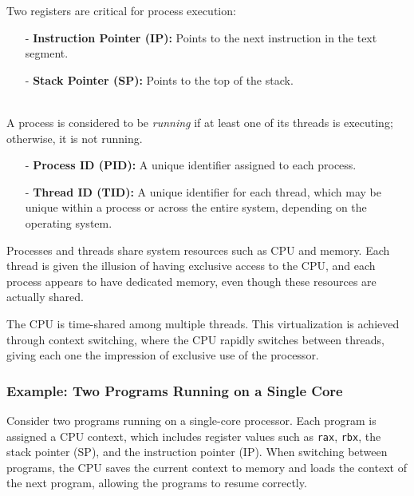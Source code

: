 \documentclass[../../compsys.tex]{subfiles}
\begin{document}
\begin{definition}
Two registers are critical for process execution:
\begin{itemize}
  \item[-] \textbf{Instruction Pointer (IP):} Points to the next instruction in the text segment.
  \item[-] \textbf{Stack Pointer (SP):} Points to the top of the stack.
\end{itemize}
\end{definition}

\begin{definition}
\leavevmode\\ %
A process is considered to be \emph{running} if at least one of its threads is executing; otherwise, it is not running.
\begin{itemize}
  \item[-] \textbf{Process ID (PID):} A unique identifier assigned to each process.
  \item[-] \textbf{Thread ID (TID):} A unique identifier for each thread, which may be unique within a process or across the entire system, depending on the operating system.
\end{itemize}
\end{definition}

\begin{definition}
Processes and threads share system resources such as CPU and memory. Each thread is given the illusion of having exclusive access to the CPU, and each process appears to have dedicated memory, even though these resources are actually shared.
\end{definition}
\vspace{10px}

\begin{definition}
The CPU is time-shared among multiple threads. This virtualization is achieved through context switching, where the CPU rapidly switches between threads, giving each one the impression of exclusive use of the processor.
\end{definition}

\subsubsection{Example: Two Programs Running on a Single Core}
\begin{example}
Consider two programs running on a single-core processor. Each program is assigned a CPU context, which includes register values such as \texttt{rax}, \texttt{rbx}, the stack pointer (SP), and the instruction pointer (IP). When switching between programs, the CPU saves the current context to memory and loads the context of the next program, allowing the programs to resume correctly.
\end{example}
\end{document}
